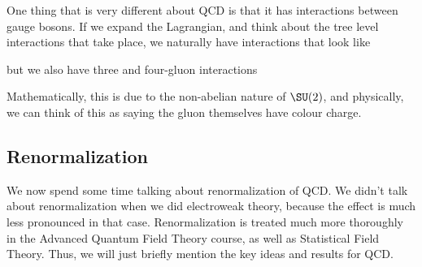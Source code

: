 \documentclass[a4paper]{article}
\begin{document}
One thing that is very different about QCD is that it has interactions between gauge bosons. If we expand the Lagrangian, and think about the tree level interactions that take place, we naturally have interactions that look like
\begin{center}
\end{center}
but we also have three and four-gluon interactions
\begin{center}
  \quad
\end{center}
Mathematically, this is due to the non-abelian nature of $\SU(2)$, and physically, we can think of this as saying the gluon themselves have colour charge.

\subsection{Renormalization}
We now spend some time talking about renormalization of QCD. We didn't talk about renormalization when we did electroweak theory, because the effect is much less pronounced in that case. Renormalization is treated much more thoroughly in the Advanced Quantum Field Theory course, as well as Statistical Field Theory. Thus, we will just briefly mention the key ideas and results for QCD.
\end{document}
